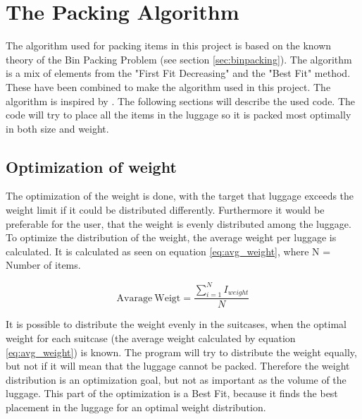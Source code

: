 \section{The Packing Algorithm}
\label{sec:algorithm}
The algorithm used for packing items in this project is based on the known theory of the Bin Packing Problem (see section \ref{sec:binpacking}). The algorithm is a mix of elements from the "First Fit Decreasing" and the "Best Fit" method. These have been combined to make the algorithm used in this project. The algorithm is inspired by \citet{three-dim-pack}. The following sections will describe the used code.
The code will try to place all the items in the luggage so it is packed most optimally in both size and weight.

\subsection{Optimization of weight}
The optimization of the weight is done, with the target that luggage exceeds the weight limit if it could be distributed differently. Furthermore it would be preferable for the user, that the weight is evenly distributed among the luggage.
To optimize the distribution of the weight, the average weight per luggage is calculated. It is calculated as seen on equation \ref{eq:avg_weight}, where N = Number of items.

\begin{equation}
	\label{eq:avg_weight}
	\mathrm{Avarage~Weigt} = \frac{\displaystyle\sum_{i=1}^{N} I_{weight}}{N}
\end{equation}

It is possible to distribute the weight evenly in the suitcases, when the optimal weight for each suitcase (the average weight calculated by equation \ref{eq:avg_weight}) is known. The program will try to distribute the weight equally, but not if it will mean that the luggage cannot be packed. Therefore the weight distribution is an optimization goal, but not as important as the volume of the luggage. This part of the optimization is a Best Fit, because it finds the best placement in the luggage for an optimal weight distribution.

